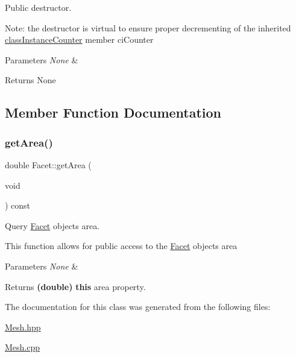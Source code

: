 Public destructor. 

Note\+: the destructor is virtual to ensure proper decrementing of the inherited \mbox{\hyperlink{classclass_instance_counter}{class\+Instance\+Counter}} member ci\+Counter 
\begin{DoxyParams}{Parameters}
{\em None} & \\
\hline
\end{DoxyParams}
\begin{DoxyReturn}{Returns}
None 
\end{DoxyReturn}


\subsection{Member Function Documentation}
\mbox{\label{class_facet_a90036d7bb3e52b57ac0d48f6bc1e019c}} 
\subsubsection{\texorpdfstring{get\+Area()}{getArea()}}
{\footnotesize\ttfamily double Facet\+::get\+Area (\begin{DoxyParamCaption}\item[{void}]{ }\end{DoxyParamCaption}) const\hspace{0.3cm}{\ttfamily [inline]}}



Query \mbox{\hyperlink{class_facet}{Facet}} object\textquotesingle{}s area. 

This function allows for public access to the \mbox{\hyperlink{class_facet}{Facet}} object\textquotesingle{}s area 
\begin{DoxyParams}{Parameters}
{\em None} & \\
\hline
\end{DoxyParams}
\begin{DoxyReturn}{Returns}
{\bfseries (double)} {\bfseries this} area property. 
\end{DoxyReturn}


The documentation for this class was generated from the following files\+:\begin{DoxyCompactItemize}
\item 
\mbox{\hyperlink{_mesh_8hpp}{Mesh.\+hpp}}\item 
\mbox{\hyperlink{_mesh_8cpp}{Mesh.\+cpp}}\end{DoxyCompactItemize}
